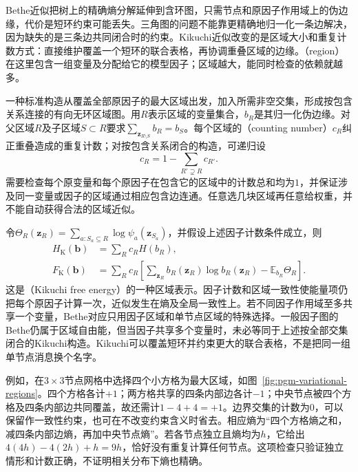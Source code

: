 \label{sec:pgm-variational-kikuchi}

Bethe近似把树上的精确熵分解延伸到含环图，只需节点和原因子作用域上的伪边缘，代价是短环约束可能丢失。三角图的问题不能靠更精确地归一化一条边解决，因为缺失的是三条边共同闭合时的约束。Kikuchi近似改变的是区域大小和重复计数方式：直接维护覆盖一个短环的联合表格，再协调重叠区域的边缘。（region）在这里包含一组变量及分配给它的模型因子；区域越大，能同时检查的依赖就越多。

一种标准构造从覆盖全部原因子的最大区域出发，加入所需非空交集，形成按包含关系连接的有向无环区域图。用$R$表示区域的变量集合，$b_R$是其归一化伪边缘。对父区域$R$及子区域$S\subset R$要求$\sum_{\bm z_{R\setminus S}}b_R=b_S$。每个区域的（counting number）$c_R$纠正重叠造成的重复计数；对按包含关系闭合的构造，可递归设
\begin{equation}
  c_R=1-\sum_{R'\supsetneq R}c_{R'}.
  \label{eq:pgm-variational-counting}
\end{equation}
需要检查每个原变量和每个原因子在包含它的区域中的计数总和均为$1$，并保证涉及同一变量或因子的区域通过相应包含边连通。任意选几块区域再任意给权重，并不能自动获得合法的区域近似。

令$\Theta_R(\bm z_R)=\sum_{a:S_a\subseteq R}\log\psi_a(\bm z_{S_a})$，并假设上述因子计数条件成立，则
\begin{equation}
  \begin{aligned}
    H_{\mathrm K}(\bm b)&=\sum_R c_R H(b_R),\\
    F_{\mathrm K}(\bm b)
      &=\sum_R c_R\left[
          \sum_{\bm z_R}b_R(\bm z_R)\log b_R(\bm z_R)
          -\mathbb E_{b_R}\Theta_R\right].
  \end{aligned}
  \label{eq:pgm-variational-kikuchi}
\end{equation}
这是（Kikuchi free energy）的一种区域表示。因子计数和区域一致性使能量项仍把每个原因子计算一次，近似发生在熵及全局一致性上。若不同因子作用域至多共享一个变量，Bethe对应只用因子区域和单节点区域的特殊选择。一般因子图的Bethe仍属于区域自由能，但当因子共享多个变量时，未必等同于上述按全部交集闭合的Kikuchi构造。Kikuchi可以覆盖短环并约束更大的联合表格，不是把同一组单节点消息换个名字。

例如，在$3\times3$节点网格中选择四个小方格为最大区域，如图~\ref{fig:pgm-variational-regions}。四个方格各计$+1$；两方格共享的四条内部边各计$-1$；中央节点被四个方格及四条内部边共同覆盖，故还需计$1-4+4=+1$。边界交集的计数为$0$，可以保留作一致性约束，也可在不改变约束含义时省去。相应熵为“四个方格熵之和，减四条内部边熵，再加中央节点熵”。若各节点独立且熵均为$h$，它给出$4(4h)-4(2h)+h=9h$，恰好没有重复计算任何节点。这项检查只验证独立情形和计数正确，不证明相关分布下熵也精确。

